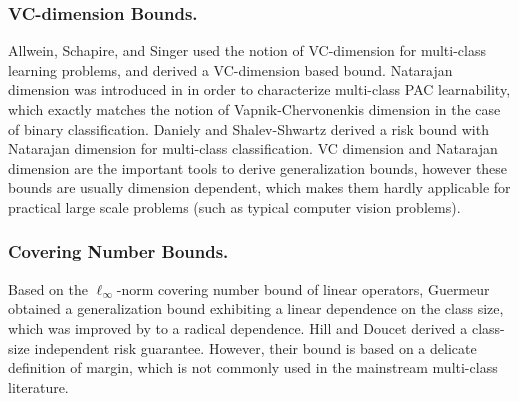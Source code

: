 \documentclass{article}
\begin{document}
    \subsubsection{VC-dimension Bounds.}
    Allwein, Schapire, and Singer   used the notion of VC-dimension
    for multi-class learning problems,
    and derived a VC-dimension based bound.
    Natarajan dimension was introduced in \cite{Natarajan1989} in
    order to characterize multi-class PAC learnability,
    which exactly matches the notion of Vapnik-Chervonenkis
    dimension in the case of binary classification.
    Daniely and Shalev-Shwartz  derived a risk bound with Natarajan dimension for multi-class classification.
    VC dimension and Natarajan dimension are the important tools to derive generalization bounds,
    however these bounds are usually dimension
    dependent, which makes them hardly applicable for practical large
    scale problems (such as typical computer vision problems).
   \subsubsection{Covering Number  Bounds.}
    Based on the $\ell_\infty$-norm covering number bound of
    linear operators, Guermeur  obtained
    a generalization bound exhibiting a linear dependence on the class size,
    which was improved by \cite{zhang2004statistical} to a radical dependence.
    Hill and Doucet  derived a class-size independent risk guarantee.
    However, their bound is based on a delicate definition of margin,
    which is not commonly used in the mainstream multi-class literature.
\end{document}
